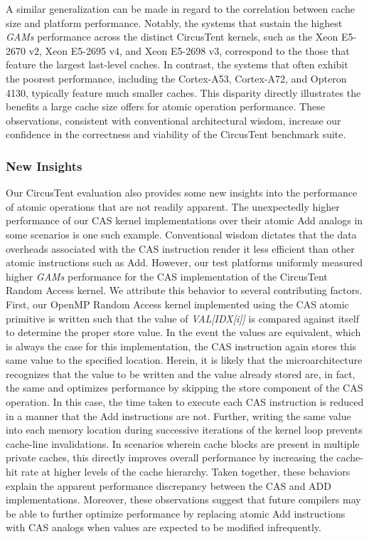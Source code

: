 A similar generalization can be made in regard to the correlation between cache size and platform performance.
Notably, the systems that sustain the highest \textit{GAMs} performance across the distinct CircusTent kernels, such as the Xeon E5-2670 v2, Xeon E5-2695 v4, and Xeon E5-2698 v3, correspond to the those that feature the largest last-level caches.
In contrast, the systems that often exhibit the poorest performance, including the Cortex-A53, Cortex-A72, and Opteron 4130, typically feature much smaller caches.
This disparity directly illustrates the benefits a large cache size offers for atomic operation performance.
These observations, consistent with conventional architectural wisdom, increase our confidence in the correctness and viability of the CircusTent benchmark suite.

\subsubsection{New Insights}
\label{subsubsec:new_insights}

Our CircusTent evaluation also provides some new insights into the performance of atomic operations that are not readily apparent.
The unexpectedly higher performance of our CAS kernel implementations over their atomic Add analogs in some scenarios is one such example.
Conventional wisdom dictates that the data overheads associated with the CAS instruction render it less efficient than other atomic instructions such as Add.
However, our test platforms uniformly measured higher \textit{GAMs} performance for the CAS implementation of the CircusTent Random Access kernel.
We attribute this behavior to several contributing factors.
First, our OpenMP Random Access kernel implemented using the CAS atomic primitive is written such that the value of \textit{VAL[IDX[i]]} is compared against itself to determine the proper store value.
In the event the values are equivalent, which is always the case for this implementation, the CAS instruction again stores this same value to the specified location.
Herein, it is likely that the microarchitecture recognizes that the value to be written and the value already stored are, in fact, the same and optimizes performance by skipping the store component of the CAS operation.
In this case, the time taken to execute each CAS instruction is reduced in a manner that the Add instructions are not.
Further, writing the same value into each memory location during successive iterations of the kernel loop prevents cache-line invalidations.
In scenarios wherein cache blocks are present in multiple private caches, this directly improves overall performance by increasing the cache-hit rate at higher levels of the cache hierarchy.  
Taken together, these behaviors explain the apparent performance discrepancy between the CAS and ADD implementations.
Moreover, these observations suggest that future compilers may be able to further optimize performance by replacing atomic Add instructions with CAS analogs when values are expected to be modified infrequently.


